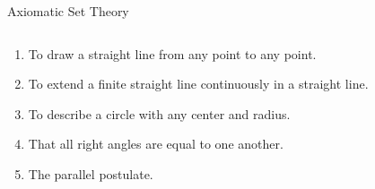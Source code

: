 
\begin{frame}{}
\end{frame}

\begin{frame}{}
\end{frame}

\begin{frame}{}
  \begin{center}
    {\Large Axiomatic Set Theory }
  \end{center}

  \vspace{0.80cm}
  \begin{columns}
  \end{columns}
\end{frame}

\begin{frame}{}

  \begin{enumerate}[(1)]
    \item To draw a straight line from any point to any point.
    \item To extend a finite straight line continuously in a straight line.
    \item To describe a circle with any center and radius.
    \item That all right angles are equal to one another.
    \item The parallel postulate.
  \end{enumerate}
\end{frame}

\begin{frame}
\end{frame}
